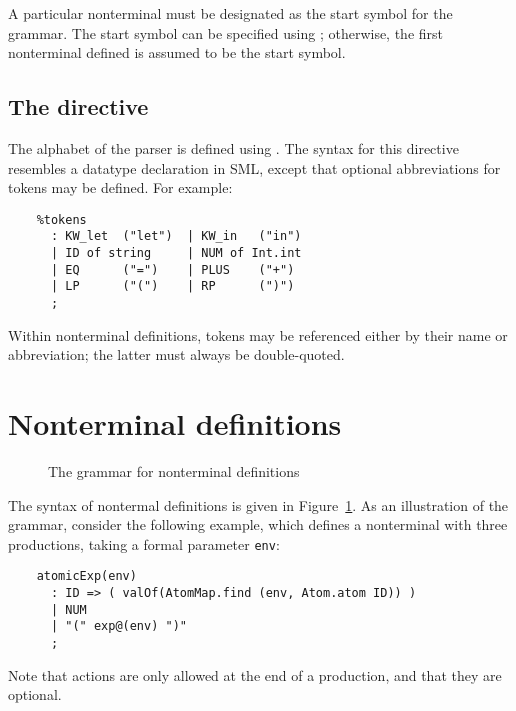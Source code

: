 A particular nonterminal must be designated as the start symbol for the grammar.  The start symbol can be specified using ; otherwise, the first nonterminal defined is assumed to be the start symbol.

\subsection{The  directive}

The alphabet of the parser is defined using .  The syntax for this directive resembles a datatype declaration in SML, except that optional abbreviations for tokens may be defined.  For example:
\begin{verbatim}
    %tokens
      : KW_let  ("let")  | KW_in   ("in")
      | ID of string     | NUM of Int.int
      | EQ      ("=")    | PLUS    ("+")
      | LP      ("(")    | RP      (")")
      ;
\end{verbatim}
Within nonterminal definitions, tokens may be referenced either by their name or abbreviation; the latter must always be double-quoted.

\section{Nonterminal definitions}\label{sec:antlr-nt}

\begin{figure}
\caption{The \antlr{} grammar for nonterminal definitions}\label{fig:antlr-nt-syntax}
\end{figure}

The syntax of nontermal definitions is given in Figure~\ref{fig:antlr-nt-syntax}.  As an illustration of the grammar, consider the following example, which defines a nonterminal with three productions, taking a formal parameter {\tt env}:
\begin{verbatim}
    atomicExp(env)
      : ID => ( valOf(AtomMap.find (env, Atom.atom ID)) )
      | NUM
      | "(" exp@(env) ")"
      ;
\end{verbatim}
Note that actions are only allowed at the end of a production, and that they are optional.

